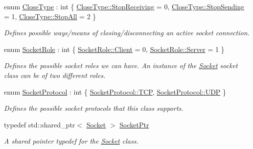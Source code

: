 \begin{DoxyCompactItemize}
\item 
enum \hyperlink{class_senergy_1_1_socket_a88ed1eb1a5c47ea1b395715aabd37ab4}{Close\-Type} \-: int \{ \hyperlink{class_senergy_1_1_socket_a88ed1eb1a5c47ea1b395715aabd37ab4a1851aea8452370ffbc6364027d018da9}{Close\-Type\-::\-Stop\-Receiving} = 0, 
\hyperlink{class_senergy_1_1_socket_a88ed1eb1a5c47ea1b395715aabd37ab4a948c383a847087d69042e091d164380b}{Close\-Type\-::\-Stop\-Sending} = 1, 
\hyperlink{class_senergy_1_1_socket_a88ed1eb1a5c47ea1b395715aabd37ab4a40b522922220c34afd8e1d4a3ba02208}{Close\-Type\-::\-Stop\-All} = 2
 \}
\begin{DoxyCompactList}\small\item\em Defines possible ways/means of closing/disconnecting an active socket connection. \end{DoxyCompactList}\item 
enum \hyperlink{class_senergy_1_1_socket_ad82ad4c4412684091e687b92641bfbe9}{Socket\-Role} \-: int \{ \hyperlink{class_senergy_1_1_socket_ad82ad4c4412684091e687b92641bfbe9a577d7068826de925ea2aec01dbadf5e4}{Socket\-Role\-::\-Client} = 0, 
\hyperlink{class_senergy_1_1_socket_ad82ad4c4412684091e687b92641bfbe9a9aa1b03934893d7134a660af4204f2a9}{Socket\-Role\-::\-Server} = 1
 \}
\begin{DoxyCompactList}\small\item\em Defines the possible socket roles we can have. An instance of the \hyperlink{class_senergy_1_1_socket}{Socket} socket class can be of two different roles. \end{DoxyCompactList}\item 
enum \hyperlink{class_senergy_1_1_socket_ad400245278746ac26e261bdda171c178}{Socket\-Protocol} \-: int \{ \hyperlink{class_senergy_1_1_socket_ad400245278746ac26e261bdda171c178ab136ef5f6a01d816991fe3cf7a6ac763}{Socket\-Protocol\-::\-T\-C\-P}, 
\hyperlink{class_senergy_1_1_socket_ad400245278746ac26e261bdda171c178af5ef036b4d8b630721e51fe23489fbc9}{Socket\-Protocol\-::\-U\-D\-P}
 \}
\begin{DoxyCompactList}\small\item\em Defines the possible socket protocols that this class supports. \end{DoxyCompactList}\item 
typedef std\-::shared\-\_\-ptr$<$ \hyperlink{class_senergy_1_1_socket}{Socket} $>$ \hyperlink{class_senergy_1_1_socket_ac9ff20ce80df2d0c2900cd0940ffe860}{Socket\-Ptr}
\begin{DoxyCompactList}\small\item\em A shared pointer typedef for the \hyperlink{class_senergy_1_1_socket}{Socket} class. \end{DoxyCompactList}\end{DoxyCompactItemize}
